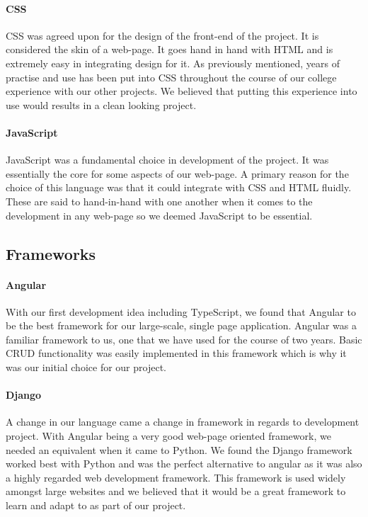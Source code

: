 \paragraph{CSS}
CSS was agreed upon for the design of the front-end of the project. It is considered the skin of a web-page. It goes hand in hand with HTML and is extremely easy in integrating design for it. As previously mentioned, years of practise and use has been put into CSS throughout the course of our college experience with our other projects. We believed that putting this experience into use would results in a clean looking project.

\paragraph{JavaScript}
JavaScript was a fundamental choice in development of the project. It was essentially the core for some aspects of our web-page. A primary reason for the choice of this language was that it could integrate with CSS and HTML fluidly. These are said to hand-in-hand with one another when it comes to the development in any web-page so we deemed JavaScript to be essential.

\subsection{Frameworks}
\paragraph{Angular}
With our first development idea including TypeScript, we found that Angular to be the best framework for our large-scale, single page application. Angular was a familiar framework to us, one that we have used for the course of two years. Basic CRUD functionality was easily implemented in this framework which is why it was our initial choice for our project.

\paragraph{Django}
A change in our language came a change in framework in regards to development project. With Angular being a very good web-page oriented framework, we needed an equivalent when it came to Python. We found the Django framework worked best with Python and was the perfect alternative to angular as it was also a highly regarded web development framework. This framework is used widely amongst large websites and we believed that it would be a great framework to learn and adapt to as part of our project. 
\newpage
